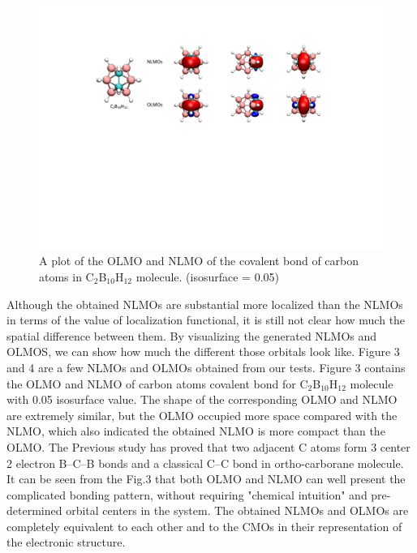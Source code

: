 \documentclass[aps,prl,reprint,amsmath,amssymb]{revtex4-1}
\begin{document}
\begin{figure}[hbpt]
\centering
\includegraphics[width=\textwidth]{figure_3.pdf}
\caption{A plot of the OLMO and NLMO of the covalent bond of carbon atoms in C$_2$B$_{10}$H$_{12}$ molecule. (isosurface = 0.05)}
\end{figure}

Although the obtained NLMOs are substantial more localized than the NLMOs in terms of the value of localization functional, it is still not clear how much the spatial difference between them.
By visualizing the generated NLMOs and OLMOS, we can show how much the different those orbitals look like.
Figure 3 and 4 are a few NLMOs and OLMOs obtained from our tests.
Figure 3 contains the OLMO and NLMO of carbon atoms covalent bond for C$_2$B$_{10}$H$_{12}$ molecule with 0.05 isosurface value.
The shape of the corresponding OLMO and NLMO are extremely similar, but the OLMO occupied more space compared with the NLMO, which also indicated the obtained NLMO is more compact than the OLMO.
The Previous study has proved that two adjacent C atoms form 3 center 2 electron B–C–B bonds and a classical C–C bond in ortho-carborane molecule.\cite{melichar2018systematic}
It can be seen from the Fig.3 that both OLMO and NLMO can well present the complicated bonding pattern, without requiring "chemical intuition" and pre-determined orbital centers in the system.
The obtained NLMOs and OLMOs  are completely equivalent to each other and to the CMOs in their representation of the electronic structure.
\end{document}
